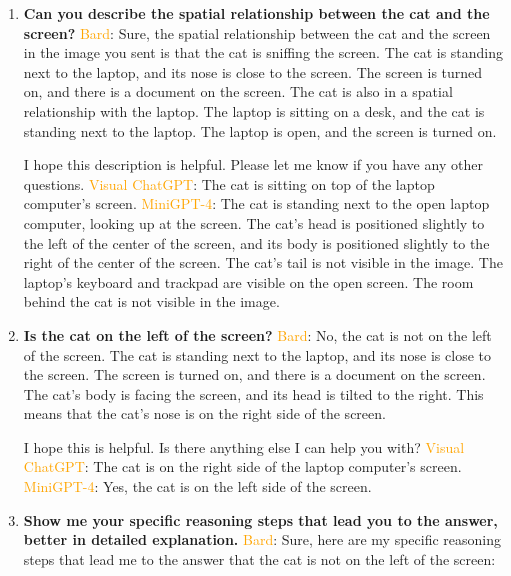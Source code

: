     \begin{enumerate}
        \item \textbf{Can you describe the spatial relationship between the cat and the screen?}
        \subitem \textcolor{orange}{Bard}:
        Sure, the spatial relationship between the cat and the screen in the image you sent is that the cat is sniffing the screen. The cat is standing next to the laptop, and its nose is close to the screen. The screen is turned on, and there is a document on the screen.
        The cat is also in a spatial relationship with the laptop. The laptop is sitting on a desk, and the cat is standing next to the laptop. The laptop is open, and the screen is turned on.

        I hope this description is helpful. Please let me know if you have any other questions.
        \subitem \textcolor{orange}{Visual ChatGPT}: The cat is sitting on top of the laptop computer's screen.
        \subitem \textcolor{orange}{MiniGPT-4}: The cat is standing next to the open laptop computer, looking up at the screen. The cat’s head is positioned slightly to the left of the center of the screen, and its body is positioned slightly to the right of the center of the screen. The cat’s tail is not visible in the image. The laptop’s keyboard and trackpad are visible on the open screen. The room behind the cat is not visible in the image.
        \item \textbf{Is the cat on the left of the screen?}
        \subitem \textcolor{orange}{Bard}: 
        No, the cat is not on the left of the screen. The cat is standing next to the laptop, and its nose is close to the screen. The screen is turned on, and there is a document on the screen. The cat's body is facing the screen, and its head is tilted to the right. This means that the cat's nose is on the right side of the screen.
        
        I hope this is helpful. Is there anything else I can help you with?
        \subitem \textcolor{orange}{Visual ChatGPT}: The cat is on the right side of the laptop computer's screen.
        \subitem \textcolor{orange}{MiniGPT-4}: Yes, the cat is on the left side of the screen.
        \item \textbf{Show me your specific reasoning steps that lead you to the answer, better in detailed explanation.}
        \subitem \textcolor{orange}{Bard}:
        Sure, here are my specific reasoning steps that lead me to the answer that the cat is not on the left of the screen:
        

\end{enumerate}
